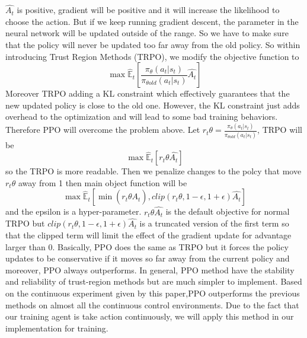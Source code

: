 \documentclass[journal,onecolumn]{IEEEtran}
\begin{document}
$\hat{A_t}$ is positive, gradient will be positive and it will increase the likelihood to choose the action. But if we keep running gradient descent, the parameter in the neural network will be updated outside of the range. So we have to make sure that the policy will never be updated too far away from the old policy. So within introducing Trust Region Methods (TRPO)\cite{SWPRK}, we modify the objective function to $$ \max\hat{\mathbb{E}}_{t}[\frac{\pi_{\theta}(a_{t}|s_{t})}{\pi_{\theta old}(a_{t}|s_{t})}\hat{A_t}] $$Moreover TRPO adding a KL constraint  which effectively guarantees that the new updated policy is close to the old one. However, the KL constraint just adds overhead to the optimization and will lead to some bad training behaviors. Therefore PPO will overcome the problem above.  Let  $r_{t}\theta = \frac{\pi_{\theta}(a_{t}|s_{t})}{\pi_{\theta old}(a_{t}|s_{t})}$, TRPO will be $$ \max\hat{\mathbb{E}}_{t}[r_{t}\theta \hat{A_t}] $$ so the TRPO is more readable. Then we penalize changes to the polcy that move $r_{t}\theta$ away from 1 then main object function will be $$ \max \hat{\mathbb{E}}_{t} [\min(r_{t}\theta \hat{A_t}), clip(r_{t}\theta,1-\epsilon,1+\epsilon)\hat{A_t}]$$ and the epsilon is a hyper-parameter. $r_{t}\theta \hat{A_t}$ is the default objective for normal TRPO but $clip(r_{t}\theta,1-\epsilon,1+\epsilon)\hat{A_t}$ is a truncated version of the first term so that the clipped term will limit the effect of the gradient update for advantage larger than 0\cite{SWPRK}. Basically, PPO does the same as TRPO but it forces the policy updates to be conservative if it moves so far away from the current policy and moreover, PPO always outperforms. In general, PPO method have the stability and reliability of trust-region methods but are much simpler to implement\cite{SWPRK}. Based on the continuous experiment given by this paper,PPO outperforms the previous methods on almost all the continuous control environments. Due to the fact that our training agent is take action continuously, we will apply this method in our implementation for training.
\end{document}
